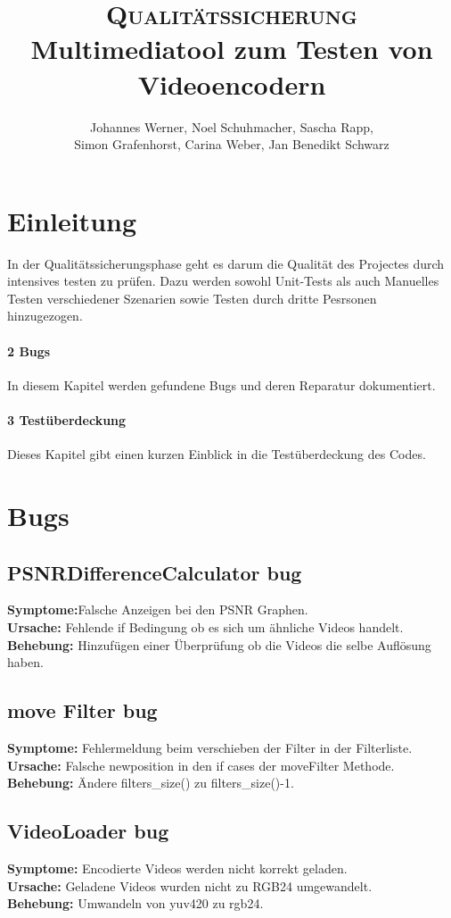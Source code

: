 \documentclass{scrartcl}
\title{\fontsize{40}{48} \selectfont \textsc{Qualitätssicherung}\\
{\fontsize{18}{18} \selectfont Multimediatool zum Testen von Videoencodern}}}
\author {Johannes Werner, Noel Schuhmacher, Sascha Rapp,\\ Simon Grafenhorst,
Carina Weber, Jan Benedikt Schwarz}
\begin{document}
 {
\maketitle
\thispagestyle{empty}
\pagestyle{empty}
\newpage
\setcounter{page}{0}
\tableofcontents
\clearpage
\pagestyle{plain}
\newpage
\section{Einleitung}
In der Qualitätssicherungsphase geht es darum die Qualität des Projectes  durch intensives testen zu prüfen. Dazu werden sowohl Unit-Tests als auch Manuelles Testen verschiedener Szenarien sowie Testen durch dritte Pesrsonen hinzugezogen.
\paragraph{2 Bugs} In diesem Kapitel werden gefundene Bugs und deren Reparatur dokumentiert.
\paragraph{3 Testüberdeckung} Dieses Kapitel gibt einen kurzen Einblick in die Testüberdeckung des Codes.
\newpage
\section{Bugs}
\subsection{PSNRDifferenceCalculator bug}
\textbf{Symptome:}Falsche Anzeigen bei den PSNR Graphen.\\
\textbf{Ursache:} Fehlende if Bedingung ob es sich um ähnliche Videos handelt.\\
\textbf{Behebung:} Hinzufügen einer Überprüfung ob die Videos die selbe Auflösung haben.
\subsection{move Filter bug}
\textbf{Symptome:} Fehlermeldung beim verschieben der Filter in der Filterliste.\\
\textbf{Ursache:} Falsche newposition in den if cases der moveFilter Methode.\\
\textbf{Behebung:} Ändere filters\_size() zu filters\_size()-1.
\subsection{VideoLoader bug}
\textbf{Symptome:}
Encodierte Videos werden nicht korrekt geladen.\\
\textbf{Ursache:}
Geladene Videos wurden nicht zu RGB24 umgewandelt.\\
\textbf{Behebung:}
Umwandeln von yuv420 zu rgb24.
}
\end{document}
